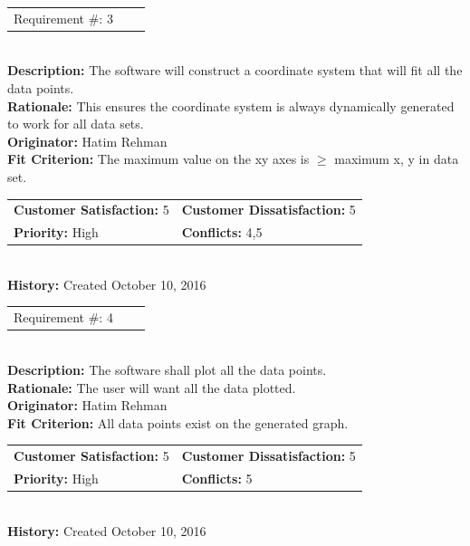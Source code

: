 \documentclass[12pt, titlepage]{article}
\begin{document}
\begin{reqbox}
\begin{tabular}{ccc}Requirement \#: 3
\end{tabular} \\
\textbf{Description:} The software will construct a coordinate system that will fit all the data points.\\
\textbf{Rationale:} This ensures the coordinate system is always dynamically generated to work for all data sets. \\
\textbf{Originator:} Hatim Rehman \\
\textbf{Fit Criterion:} The maximum value on the xy axes is $\geq$ maximum x, y in data set.\\
\begin{tabular}{ll}
\textbf{Customer Satisfaction:} 5 & \textbf{Customer Dissatisfaction:} 5 \\
\textbf{Priority:} High & \textbf{Conflicts:} 4,5\\
\end{tabular} \\
\textbf{History:} Created October 10, 2016
\end{reqbox}

\begin{reqbox}
\begin{tabular}{ccc}Requirement \#: 4
\end{tabular} \\
\textbf{Description:} The software shall plot all the data points.\\
\textbf{Rationale:} The user will want all the data plotted. \\
\textbf{Originator:} Hatim Rehman \\
\textbf{Fit Criterion:} All data points exist on the generated graph.\\
\begin{tabular}{ll}
\textbf{Customer Satisfaction:} 5 & \textbf{Customer Dissatisfaction:} 5 \\
\textbf{Priority:} High & \textbf{Conflicts:} 5\\
\end{tabular} \\
\textbf{History:} Created October 10, 2016
\end{reqbox}
\end{document}
